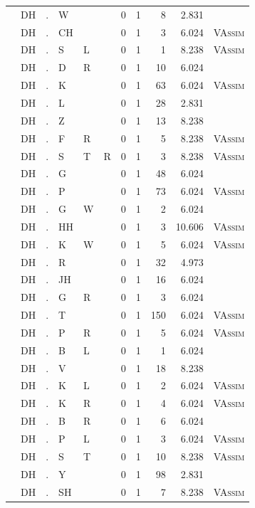 \documentclass[12pt]{article}
\begin{document}
\begin{longtable}{r@{ } r@{ } c@{ } l@{ } l@{ } l@{ } r r r r l }
 & DH & . & W &  &  & 0 & 1 & 8 & 2.831 &  \\
 & DH & . & CH &  &  & 0 & 1 & 3 & 6.024 & \textsc{VAssim} \\
 & DH & . & S & L &  & 0 & 1 & 1 & 8.238 & \textsc{VAssim} \\
 & DH & . & D & R &  & 0 & 1 & 10 & 6.024 &  \\
 & DH & . & K &  &  & 0 & 1 & 63 & 6.024 & \textsc{VAssim} \\
 & DH & . & L &  &  & 0 & 1 & 28 & 2.831 &  \\
 & DH & . & Z &  &  & 0 & 1 & 13 & 8.238 &  \\
 & DH & . & F & R &  & 0 & 1 & 5 & 8.238 & \textsc{VAssim} \\
 & DH & . & S & T & R & 0 & 1 & 3 & 8.238 & \textsc{VAssim} \\
 & DH & . & G &  &  & 0 & 1 & 48 & 6.024 &  \\
 & DH & . & P &  &  & 0 & 1 & 73 & 6.024 & \textsc{VAssim} \\
 & DH & . & G & W &  & 0 & 1 & 2 & 6.024 &  \\
 & DH & . & HH &  &  & 0 & 1 & 3 & 10.606 & \textsc{VAssim} \\
 & DH & . & K & W &  & 0 & 1 & 5 & 6.024 & \textsc{VAssim} \\
 & DH & . & R &  &  & 0 & 1 & 32 & 4.973 &  \\
 & DH & . & JH &  &  & 0 & 1 & 16 & 6.024 &  \\
 & DH & . & G & R &  & 0 & 1 & 3 & 6.024 &  \\
 & DH & . & T &  &  & 0 & 1 & 150 & 6.024 & \textsc{VAssim} \\
 & DH & . & P & R &  & 0 & 1 & 5 & 6.024 & \textsc{VAssim} \\
 & DH & . & B & L &  & 0 & 1 & 1 & 6.024 &  \\
 & DH & . & V &  &  & 0 & 1 & 18 & 8.238 &  \\
 & DH & . & K & L &  & 0 & 1 & 2 & 6.024 & \textsc{VAssim} \\
 & DH & . & K & R &  & 0 & 1 & 4 & 6.024 & \textsc{VAssim} \\
 & DH & . & B & R &  & 0 & 1 & 6 & 6.024 &  \\
 & DH & . & P & L &  & 0 & 1 & 3 & 6.024 & \textsc{VAssim} \\
 & DH & . & S & T &  & 0 & 1 & 10 & 8.238 & \textsc{VAssim} \\
 & DH & . & Y &  &  & 0 & 1 & 98 & 2.831 &  \\
 & DH & . & SH &  &  & 0 & 1 & 7 & 8.238 & \textsc{VAssim} \\

\end{longtable}
\end{document}
